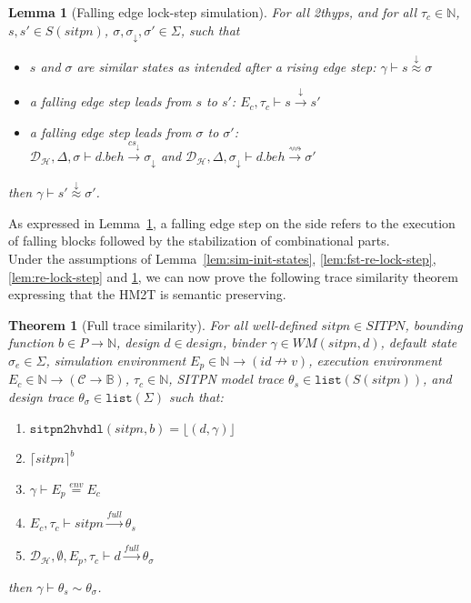 \documentclass[pdflatex,sn-mathphys]{sn-jnl}%
\theoremstyle{thmstyleone}%
\newtheorem{theorem}{Theorem}%
\theoremstyle{thmstyletwo}%
\theoremstyle{thmstylethree}%
\newtheorem{lemma}{Lemma}%
\begin{document}
\begin{lemma}[Falling edge lock-step simulation]
  \label{lem:fe-lock-step}
  For all \hm2thyps{}, and for all $\tau_c\in\mathbb{N}$,
  $s,s'\in{}S(sitpn)$, $\sigma,\sigma_\downarrow,\sigma'\in\Sigma$,
  such that
  \begin{itemize}
  \item $s$ and $\sigma$ are similar states as intended after a rising
    edge step: $\gamma\vdash{}s\stackrel{\downarrow}{\approx}\sigma$
  \item a falling edge step leads from $s$ to $s'$:
    $E_c,\tau_c\vdash{}s\xrightarrow{\downarrow}s'$
  \item a falling edge step leads from $\sigma$ to $\sigma'$:\\
    $\mathcal{D}_\mathcal{H},\Delta,\sigma\vdash{}d.beh\xrightarrow{cs_{\downarrow}}\sigma_{\downarrow}$
    and
    $\mathcal{D}_\mathcal{H},\Delta,\sigma_{\downarrow}\vdash{}d.beh\xrightarrow{\rightsquigarrow}\sigma'$
  \end{itemize}
  then $\gamma\vdash{}s'\stackrel{\downarrow}{\approx}{}\sigma'$.
\end{lemma}

As expressed in Lemma~\ref{lem:fe-lock-step}, a falling edge step on
the \hvhdl{} side refers to the execution of falling blocks followed
by the stabilization of combinational parts.\\

Under the assumptions of Lemma~\ref{lem:sim-init-states},
\ref{lem:fst-re-lock-step}, \ref{lem:re-lock-step} and
\ref{lem:fe-lock-step}, we can now prove the following trace
similarity theorem expressing that the HM2T is semantic preserving.

\begin{theorem}[Full trace similarity]
  \label{thm:full-trace-sim}
  For all well-defined $sitpn\in{}SITPN$, bounding function
  $b\in{}P\rightarrow\mathbb{N}$, \hvhdl{} design $d\in{}design$,
  binder $\gamma\in{}WM(sitpn,d)$, default state $\sigma_e\in\Sigma$,
  simulation environment
  $E_p\in\mathbb{N}\rightarrow{}(id\nrightarrow{}v)$, execution
  environment
  $E_c\in\mathbb{N}\rightarrow(\mathcal{C}\rightarrow\mathbb{B})$,
  $\tau_c\in\mathbb{N}$, SITPN model trace
  $\theta_s\in\mathtt{list}(S(sitpn))$, and \hvhdl{} design trace
  $\theta_\sigma\in\mathtt{list}(\Sigma)$ such that:
  \begin{enumerate}
  \item $\mathtt{sitpn2hvhdl}(sitpn, b)=\lfloor(d,\gamma)\rfloor$
  \item $\lceil{}sitpn\rceil^b$
  \item $\gamma\vdash{}E_p\stackrel{env}{=}E_c$
  \item $E_c,\tau_c\vdash{}sitpn\xrightarrow{full}\theta_s$
  \item
    $\mathcal{D}_\mathcal{H},\emptyset,E_p,\tau_c\vdash{}d\xrightarrow{full}\theta_\sigma$
  \end{enumerate}
  then $\gamma\vdash\theta_s\sim\theta_\sigma$.
\end{theorem}
\end{document}
